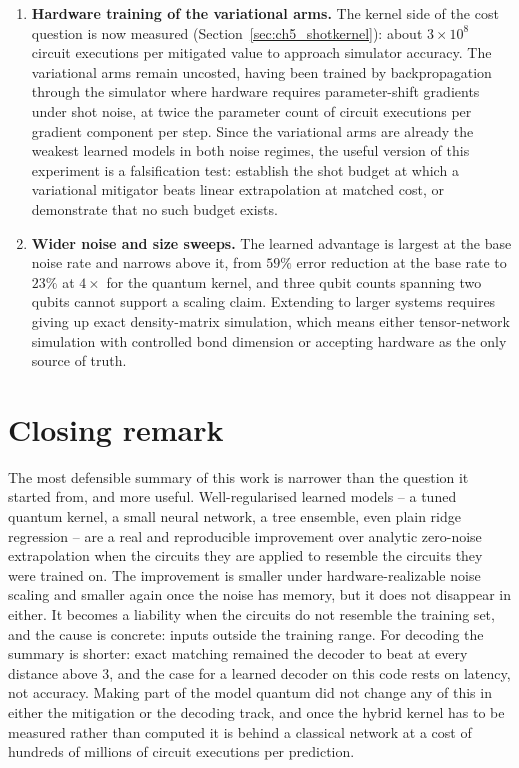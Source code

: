 \documentclass[Thesis.tex]{subfiles}
\begin{document}
\begin{enumerate}
    \item \textbf{Hardware training of the variational arms.} The kernel side of the
    cost question is now measured (Section~\ref{sec:ch5_shotkernel}): about
    $3 \times 10^8$ circuit executions per mitigated value to approach simulator
    accuracy. The variational arms
    remain uncosted, having been trained by backpropagation through the simulator
    where hardware requires parameter-shift gradients under shot noise, at twice the
    parameter count of circuit executions per gradient component per step. Since the
    variational arms are already the weakest learned models in both noise regimes,
    the useful version of this experiment is a falsification test: establish the shot
    budget at which a variational mitigator beats linear extrapolation at matched
    cost, or demonstrate that no such budget exists.

    \item \textbf{Wider noise and size sweeps.} The learned advantage is largest at
    the base noise rate and narrows above it, from $59\%$ error reduction at the
    base rate to $23\%$ at $4\times$ for the quantum kernel, and three qubit counts spanning two qubits cannot support a scaling
    claim. Extending to larger systems requires giving up exact density-matrix
    simulation, which means either tensor-network simulation with controlled bond
    dimension or accepting hardware as the only source of truth.
\end{enumerate}

\section{Closing remark}

The most defensible summary of this work is narrower than the question it started
from, and more useful. Well-regularised learned models -- a tuned quantum kernel, a
small neural network, a tree ensemble, even plain ridge regression -- are a real and
reproducible improvement over analytic zero-noise extrapolation when the circuits
they are applied to resemble the circuits they were trained on. The improvement is
smaller under hardware-realizable noise scaling and smaller again once the noise has
memory, but it does not disappear in either. It becomes a liability when the
circuits do not resemble the training set, and the cause is concrete: inputs outside
the training range. For decoding the summary is shorter: exact matching remained the
decoder to beat at every distance above $3$, and the case for a learned decoder on
this code rests on latency, not accuracy. Making part of the model quantum did not
change any of this in either the mitigation or the decoding track, and once the hybrid kernel has to be
measured rather than computed it is behind a classical network at a cost of hundreds
of millions of circuit executions per prediction.
\end{document}
